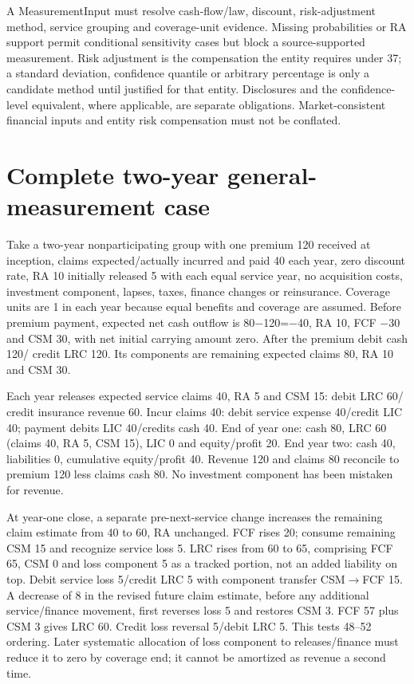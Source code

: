 A MeasurementInput must resolve cash-flow/law, discount, risk-adjustment method, service grouping and coverage-unit evidence. Missing probabilities or RA support permit conditional sensitivity cases but block a source-supported measurement. Risk adjustment is the compensation the entity requires under 37; a standard deviation, confidence quantile or arbitrary percentage is only a candidate method until justified for that entity. Disclosures and the confidence-level equivalent, where applicable, are separate obligations. Market-consistent financial inputs and entity risk compensation must not be conflated.

\hypertarget{complete-two-year-general-measurement-case}{%
\section{Complete two-year general-measurement case}\label{method-insurance-methods-complete-two-year-general-measurement-case}}

Take a two-year nonparticipating group with one premium 120 received at inception, claims expected/actually incurred and paid 40 each year, zero discount rate, RA 10 initially released 5 with each equal service year, no acquisition costs, investment component, lapses, taxes, finance changes or reinsurance. Coverage units are 1 in each year because equal benefits and coverage are assumed. Before premium payment, expected net cash outflow is 80\ensuremath{-}120=\ensuremath{-}40, RA 10, FCF \ensuremath{-}30 and CSM 30, with net initial carrying amount zero. After the premium debit cash 120/ credit LRC 120. Its components are remaining expected claims 80, RA 10 and CSM 30.

Each year releases expected service claims 40, RA 5 and CSM 15: debit LRC 60/ credit insurance revenue 60. Incur claims 40: debit service expense 40/credit LIC 40; payment debits LIC 40/credits cash 40. End of year one: cash 80, LRC 60 (claims 40, RA 5, CSM 15), LIC 0 and equity/profit 20. End year two: cash 40, liabilities 0, cumulative equity/profit 40. Revenue 120 and claims 80 reconcile to premium 120 less claims cash 80. No investment component has been mistaken for revenue.

At year-one close, a separate pre-next-service change increases the remaining claim estimate from 40 to 60, RA unchanged. FCF rises 20; consume remaining CSM 15 and recognize service loss 5. LRC rises from 60 to 65, comprising FCF 65, CSM 0 and loss component 5 as a tracked portion, not an added liability on top. Debit service loss 5/credit LRC 5 with component transfer CSM\ensuremath{\rightarrow}FCF 15. A decrease of 8 in the revised future claim estimate, before any additional service/finance movement, first reverses loss 5 and restores CSM 3. FCF 57 plus CSM 3 gives LRC 60. Credit loss reversal 5/debit LRC 5. This tests 48--52 ordering. Later systematic allocation of loss component to releases/finance must reduce it to zero by coverage end; it cannot be amortized as revenue a second time.

